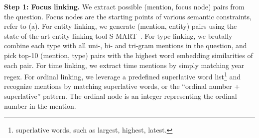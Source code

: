 
\textbf{Step 1: Focus linking.}
We extract possible (mention, focus node) pairs from the question.
Focus nodes are the starting points of various semantic constraints,
refer to (a).
For entity linking, we generate (mention, entity) pairs
using the state-of-the-art entity linking tool S-MART~\cite{yang2015s}.
For type linking,
we brutally combine each type with all uni-, bi- and tri-gram mentions in the question,
and pick top-10 (mention, type) pairs with the highest
word embedding similarities of each pair.
For time linking, we extract time mentions by simply matching year regex.
For ordinal linking, we leverage a predefined superlative word list\footnote{
 superlative words, such as largest, highest, latest.}
and recognize mentions by matching superlative words,
or the ``ordinal number + superlative'' pattern.
The ordinal node is an integer representing the ordinal number in the mention.


